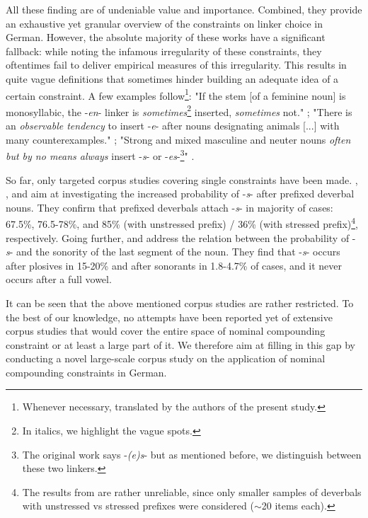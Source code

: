 \documentclass[10pt, a4paper]{article}
\begin{document}
All these finding are of undeniable value and importance. Combined, they provide an exhaustive yet granular overview of the constraints on linker choice in German. However, the absolute majority of these works have a significant fallback: while noting the infamous irregularity of these constraints, they oftentimes fail to deliver empirical measures of this irregularity. This results in quite vague definitions that sometimes hinder building an adequate idea of a certain constraint. A few examples follow\footnote{Whenever necessary, translated by the authors of the present study.}: "If the stem [of a feminine noun] is monosyllabic, the -\textit{en}- linker is \textit{sometimes}\footnote{In italics, we highlight the vague spots.} inserted, \textit{sometimes} not." \citep[229]{eisenberg_2013}; "There is an \textit{observable tendency} to insert -\textit{e}- after nouns designating animals [...] with many counterexamples." \citep[11]{nuebling_szczepaniak_2008}; "Strong and mixed masculine and neuter nouns \textit{often but by no means always} insert -\textit{s}- or -\textit{es}-\footnote{The original work says -\textit{(e)s}- but as mentioned before, we distinguish between these two linkers.}" \citep[229]{schaefer_2018}.

So far, only targeted corpus studies covering single constraints have been made. \citet{kopf_2017}, \citet{kuerschner_2005}, and \citet{nuebling_szczepaniak_2008} aim at investigating the increased probability of -\textit{s}- after prefixed deverbal nouns. They confirm that prefixed deverbals attach -\textit{s}- in majority of cases: 67.5\%, 76.5-78\%, and 85\% (with unstressed prefix) / 36\% (with stressed prefix)\footnote{The results from \citet{nuebling_szczepaniak_2008} are rather unreliable, since only smaller samples of deverbals with unstressed vs stressed prefixes were considered ($\sim$20 items each).}, respectively. Going further, \citet{nuebling_szczepaniak_2008} and \citet{wegener_2005} address the relation between the probability of -\textit{s}- and the sonority of the last segment of the noun. They find that -\textit{s}- occurs after plosives in 15-20\% and after sonorants in 1.8-4.7\% of cases, and it never occurs after a full vowel.


It can be seen that the above mentioned corpus studies are rather restricted. To the best of our knowledge, no attempts have been reported yet of extensive corpus studies that would cover the entire space of nominal compounding constraint or at least a large part of it. We therefore aim at filling in this gap by conducting a novel large-scale corpus study on the application of nominal compounding constraints in German.
\end{document}

